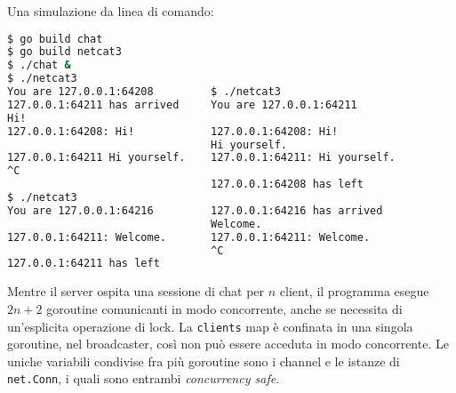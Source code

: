 \documentclass[../../thesis.tex]{subfiles}
\begin{document}
    Una simulazione da linea di comando:
    \begin{lstlisting}[language = bash, frame = L, label = {lst:lstlisting7-10.4}]
$ go build chat
$ go build netcat3
$ ./chat &
$ ./netcat3
You are 127.0.0.1:64208         $ ./netcat3
127.0.0.1:64211 has arrived     You are 127.0.0.1:64211
Hi!
127.0.0.1:64208: Hi!            127.0.0.1:64208: Hi!
                                Hi yourself.
127.0.0.1:64211 Hi yourself.    127.0.0.1:64211: Hi yourself.
^C
                                127.0.0.1:64208 has left
$ ./netcat3
You are 127.0.0.1:64216         127.0.0.1:64216 has arrived
                                Welcome.
127.0.0.1:64211: Welcome.       127.0.0.1:64211: Welcome.
                                ^C
127.0.0.1:64211 has left
    \end{lstlisting}
    Mentre il server ospita una sessione di chat per $n$ client, il programma esegue $2n+2$ goroutine comunicanti in modo concorrente, anche se necessita di un'esplicita operazione di lock.
    La \verb"clients" map è confinata in una singola goroutine, nel broadcaster, così non può essere acceduta in modo concorrente.
    Le uniche variabili condivise fra più goroutine sono i channel e le istanze di \verb"net.Conn", i quali sono entrambi \textit{concurrency safe}.
\end{document}
